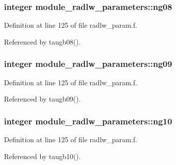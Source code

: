 \subsubsection[{\texorpdfstring{ng08}{ng08}}]{\setlength{\rightskip}{0pt plus 5cm}integer module\+\_\+radlw\+\_\+parameters\+::ng08}\hypertarget{namespacemodule__radlw__parameters_a61aba0726187e15acf8bae5c377dbdd5}{}\label{namespacemodule__radlw__parameters_a61aba0726187e15acf8bae5c377dbdd5}


Definition at line 125 of file radlw\+\_\+param.\+f.



Referenced by taugb08().

\subsubsection[{\texorpdfstring{ng09}{ng09}}]{\setlength{\rightskip}{0pt plus 5cm}integer module\+\_\+radlw\+\_\+parameters\+::ng09}\hypertarget{namespacemodule__radlw__parameters_a2856b7576a44f2e35bd0fbc1e49bd270}{}\label{namespacemodule__radlw__parameters_a2856b7576a44f2e35bd0fbc1e49bd270}


Definition at line 125 of file radlw\+\_\+param.\+f.



Referenced by taugb09().

\subsubsection[{\texorpdfstring{ng10}{ng10}}]{\setlength{\rightskip}{0pt plus 5cm}integer module\+\_\+radlw\+\_\+parameters\+::ng10}\hypertarget{namespacemodule__radlw__parameters_aa764831e931a2ec27c763ebf957bbc67}{}\label{namespacemodule__radlw__parameters_aa764831e931a2ec27c763ebf957bbc67}


Definition at line 125 of file radlw\+\_\+param.\+f.



Referenced by taugb10().

